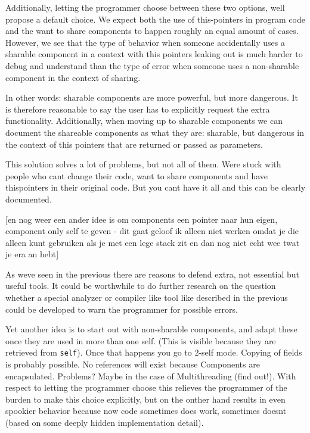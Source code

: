 \documentclass[a4paper,12pt]{book}
\begin{document}
Additionally, letting the programmer choose between these two options, well propose a default choice. We expect both the use of this-pointers in program code and the want to share components to happen roughly an equal amount of cases. However, we see that the type of behavior when someone accidentally uses a sharable component in a context with this pointers leaking out is much harder to debug and understand than the type of error when someone uses a non-sharable component in the context of sharing. 

In other words: sharable components are more powerful, but more dangerous. It is therefore reasonable to say the user has to explicitly request the extra functionality. Additionally, when moving up to sharable components we can document the shareable components as what they are: sharable, but dangerous in the context of this pointers that are returned or passed as parameters.

This solution solves a lot of problems, but not all of them. Were stuck with people who cant change their code, want to share components and have thispointers in their original code. But you cant have it all and this can be clearly documented.

[en nog weer een ander idee is om components een pointer naar hun eigen, component only self te geven - dit gaat geloof ik alleen niet werken omdat je die alleen kunt gebruiken als je met een lege stack zit en dan nog niet echt wee twat je era an hebt]

As weve seen in the previous there are reasons to defend extra, not essential but useful tools. It could be worthwhile to do further research on the question whether a special analyzer or compiler like tool like described in the previous could be developed to warn the programmer for possible errors. 

Yet another idea is to start out with non-sharable components, and adapt these once they are used in more than one self. (This is visible because they are retrieved from \verb|self|). Once that happens you go to 2-self mode. Copying of fields is probably possible. No references will exist because Components are encapsulated. Problems? Maybe in the case of Multithreading (find out!). With respect to letting the programmer choose this relieves the programmer of the burden to make this choice explicitly, but on the onther hand results in even spookier behavior because now code sometimes does work, sometimes doesnt (based on some deeply hidden implementation detail).
\end{document}
